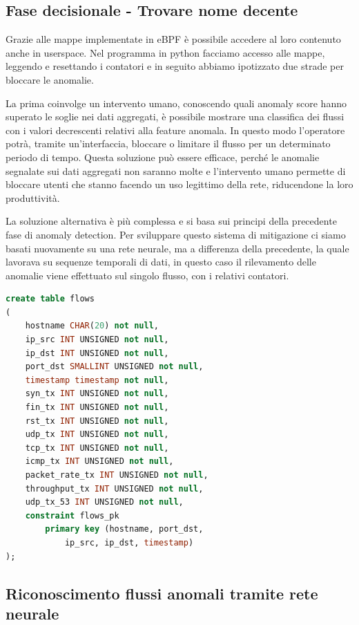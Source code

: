 \subsection{Fase decisionale - Trovare nome decente}

Grazie alle mappe implementate in eBPF è possibile accedere al loro contenuto anche in userspace. Nel programma in python facciamo accesso alle mappe, leggendo e resettando i contatori e in seguito abbiamo ipotizzato due strade per bloccare le anomalie.

La prima coinvolge un intervento umano, conoscendo quali anomaly score hanno superato le soglie nei dati aggregati, è possibile mostrare una classifica dei flussi con i valori decrescenti relativi alla feature anomala. In questo modo l'operatore potrà, tramite un'interfaccia, bloccare o limitare il flusso per un determinato periodo di tempo. Questa soluzione può essere efficace, perché le anomalie segnalate sui dati aggregati non saranno molte e l'intervento umano permette di bloccare utenti che stanno facendo un uso legittimo della rete, riducendone la loro produttività.

La soluzione alternativa è più complessa e si basa sui principi della precedente fase di anomaly detection.
Per sviluppare questo sistema di mitigazione ci siamo basati nuovamente su una rete neurale, ma a differenza della precedente, la quale lavorava su sequenze temporali di dati, in questo caso il rilevamento delle anomalie viene effettuato sul singolo flusso, con i relativi contatori.

\begin{lstlisting}[language=SQL,caption={Esempio di tabella nel database SQL.}]
create table flows
(
    hostname CHAR(20) not null,
    ip_src INT UNSIGNED not null,
    ip_dst INT UNSIGNED not null,
    port_dst SMALLINT UNSIGNED not null,
    timestamp timestamp not null,
    syn_tx INT UNSIGNED not null,
    fin_tx INT UNSIGNED not null,
    rst_tx INT UNSIGNED not null,
    udp_tx INT UNSIGNED not null,
    tcp_tx INT UNSIGNED not null,
    icmp_tx INT UNSIGNED not null,
    packet_rate_tx INT UNSIGNED not null,
    throughput_tx INT UNSIGNED not null,
    udp_tx_53 INT UNSIGNED not null,
    constraint flows_pk
        primary key (hostname, port_dst,
            ip_src, ip_dst, timestamp)
);
\end{lstlisting}

\subsection{Riconoscimento flussi anomali tramite rete neurale}

